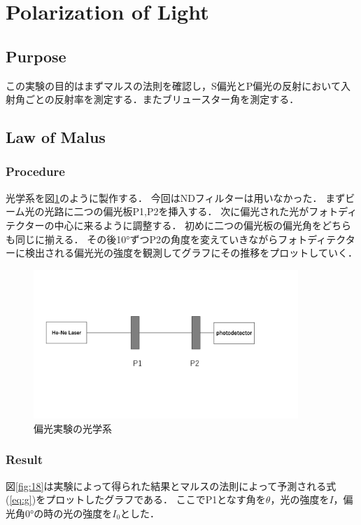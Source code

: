 \documentclass[11pt, a4paper]{jsarticle}
\begin{document}
\section{Polarization of Light}
\subsection*{Purpose}
この実験の目的はまずマルスの法則を確認し，S偏光とP偏光の反射において入射角ごとの反射率を測定する．またブリュースター角を測定する．
\subsection{Law of Malus}
\subsubsection{Procedure}
光学系を図\ref{fig:17}のように製作する．
今回はNDフィルターは用いなかった．
まずビーム光の光路に二つの偏光板P1,P2を挿入する．
次に偏光された光がフォトディテクターの中心に来るように調整する．
初めに二つの偏光板の偏光角をどちらも同じに揃える．
その後10°ずつP2の角度を変えていきながらフォトディテクターに検出される偏光光の強度を観測してグラフにその推移をプロットしていく．

\begin{figure}[htbp]
 \begin{center}
  \includegraphics[width=100mm]{fig17.png}
 \end{center}
 \caption{偏光実験の光学系}
 \label{fig:17}
\end{figure}

\subsubsection{Result}
図\ref{fig:18}は実験によって得られた結果とマルスの法則によって予測される式(\ref{eq:g})をプロットしたグラフである．
ここでP1となす角を$\theta$，光の強度を$I$，偏光角0°の時の光の強度を$I_0$とした．
\end{document}
